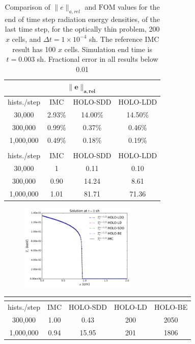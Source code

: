 \documentclass[xcolor=dvipsnames,hyperref={pdfpagelabels=false},unknownkeysallowed]{beamer}
\newcommand{\FOM}{\text{FOM}}
\begin{document}
\begin{frame}
\begin{table}[H]
\centering
\caption{\label{tab:thin_short} {Comparison of $\|e\|_{a,rel}$ and $\FOM$ values for the end of time
    step radiation energy densities, of the last time step, for the optically
    thin problem, 200 $x$ cells, and $\Delta t = 1\times 10^{-4}$ sh.  The reference IMC result has 100 $x$ cells.
    Simulation end time is ${t=0.003}$ sh. Fractional error in all results  below 0.01}}
\begin{tabular}{|c|ccc|}\cline{1-4}
    \multicolumn{4}{|c|}{$\mathbf{\|e\|_{a,rel}}$} \\ \hline
hists./step   & IMC     & HOLO-SDD  &  HOLO-LDD \\ \hline
   30,000     & 2.93\%   & 14.00\%   & 14.50\%      \\
  300,000     & 0.99\%   & 0.37\%    &  0.46\%      \\ 
  1,000,000   & 0.49\%   & 0.18\%    &  0.19\%       \\ \hline
    \multicolumn{4}{|c|}{\textbf{\FOM}} \\ \hline
hists./step   & IMC    & HOLO-SDD  &  HOLO-LDD \\ \hline
   30,000     & 1      &  0.11  & 0.10 \\
  300,000     & 0.90   &  14.24 & 8.61 \\
  1,000,000   & 1.01   &  81.71 & 71.36 \\\hline
  \end{tabular}
  \end{table}
\end{frame}


\begin{frame}
\begin{figure}[H]
    \centering
    \includegraphics[width=0.49\textwidth]{marshak_time_cont_compare.pdf}
\end{figure}
\begin{table}[H]
\centering
\begin{tabular}{|c|cccc|}\cline{2-5}
    \multicolumn{1}{c|}{}        &
    \multicolumn{4}{|c|}{\FOM} \\ \hline
hists./step    &  IMC   & HOLO-SDD  & HOLO-LD  & HOLO-BE    \\ \hline
  300,000      &  1.00  &   0.43       &  200     & 2050         \\  
  1,000,000    &  0.94  &  15.95       &  201     & 1806          \\ \hline
\end{tabular}
\end{table}
\end{frame}
\end{document}

